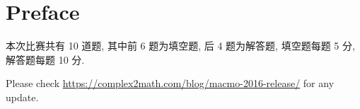 \documentclass[10pt]{article}
\begin{document}


{}
\section*{Preface}

本次比赛共有 10 道题, 其中前 6 题为填空题, 后 4 题为解答题,
填空题每题 5 分, 解答题每题 10 分.

\bigskip

Please check \url{https://complex2math.com/blog/macmo-2016-release/} for any update.

\newpage




















\end{document}
